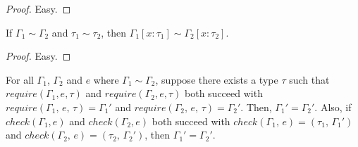 \documentclass[peerreview, 10pt]{IEEEtran}
\newcommand{\checktype}[4]{\ensuremath{{check}(#1,\,#2)=(#3,\,#4)}}
\newcommand{\requiretype}[4]{\ensuremath{{require}(#1,\,#2,\,#3)=#4}}
\begin{document}
\begin{proof}
    Easy.
\end{proof}

\begin{lemma}
    \label{lem:env-kind}
    If $\Gamma_1\sim\Gamma_2$ and $\tau_1\sim\tau_2$, then $\Gamma_1[x:\tau_1]\sim\Gamma_2[x:\tau_2]$.
\end{lemma}

\begin{proof}
    Easy.
\end{proof}

\begin{theorem}
    \label{thm:assoc-iden}
    For all $\Gamma_1$, $\Gamma_2$ and $e$ where $\Gamma_1\sim\Gamma_2$, suppose there exists a type $\tau$ such that $require(\Gamma_1, e, \tau)$ and $require(\Gamma_2, e, \tau)$ both succeed with $\requiretype{\Gamma_1}{e}{\tau}{\Gamma_1'}$ and $\requiretype{\Gamma_2}{e}{\tau}{\Gamma_2'}$. Then, $\Gamma_1'=\Gamma_2'$. Also, if $check(\Gamma_1, e)$ and $check(\Gamma_2, e)$ both succeed with $\checktype{\Gamma_1}{e}{\tau_1}{\Gamma_1'}$ and $\checktype{\Gamma_2}{e}{\tau_2}{\Gamma_2'}$, then $\Gamma_1'=\Gamma_2'$.
\end{theorem}
\end{document}
